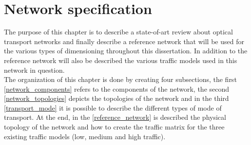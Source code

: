 
\chapter{Network specification}
\label{chap_reference_network}
The purpose of this chapter is to describe a state-of-art review about optical transport networks and finally describe a reference network that will be used for the various types of dimensioning throughout this dissertation. In addition to the reference network will also be described the various traffic models used in this network in question.\\
The organization of this chapter is done by creating four subsections, the first \ref{network_components} refers to the components of the network, the second \ref{network_topologies} depicts the topologies of the network and in the third \ref{transport_mode} it is possible to describe the different types of mode of transport. At the end, in the \ref{reference_network} is described the physical topology of the network and how to create the traffic matrix for the three existing traffic models (low, medium and high traffic).\\




